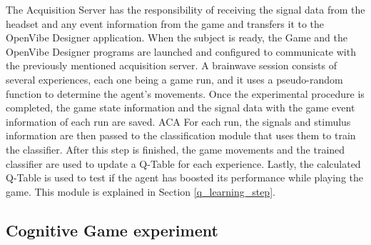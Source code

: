 \documentclass[journal]{IEEEtran}
\begin{document}
The Acquisition Server has the responsibility of receiving the signal data from the headset and any event information from the game and transfers it to the OpenVibe Designer application. When the subject is ready, the Game and the OpenVibe Designer programs are launched and configured to communicate with the previously mentioned acquisition server. A brainwave session consists of several experiences, each one being a game run, and it uses a pseudo-random function to determine the agent's movements.  Once the experimental procedure is completed, the game state information and the signal data with the game event information of each run are saved. ACA For each run, the signals and stimulus information are then passed to the classification module that uses them to train the classifier.  After this step is finished, the game movements and the trained classifier are used to update a Q-Table for each experience. Lastly, the calculated Q-Table is used to test if the agent has boosted its performance while playing the game. This module is explained in Section \ref{q_learning_step}.

\subsection{Cognitive Game experiment}
\label{cognitive_experiment_details}
\end{document}
